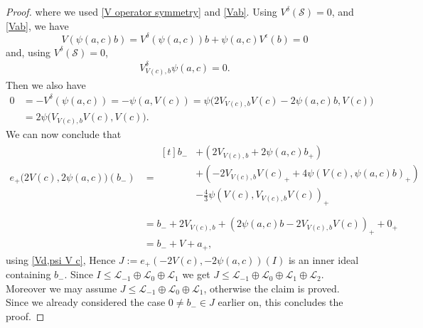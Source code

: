\documentclass[oneside,a4paper]{amsart} %
\theoremstyle{definition}
\renewcommand{\SS}{\mathcal{S}}
\newcommand{\LL}{\mathcal{L}}
\numberwithin{equation}{section}
\begin{document}
\begin{proof}
	  where we used \cref{V operator symmetry} and \cref{Vab}.
	  Using $V^\delta(\SS)=0$, \cite[(1.10)]{Allison1984} and \cref{Vab}, we have
	  \begin{equation}\label{V psi 0}
	  	V(\psi(a,c)b) = V^\delta(\psi(a,c))b+\psi(a,c)V^\epsilon(b)=0
	  \end{equation}  
	  and, using $V^\delta(\SS)=0$,
	  \begin{equation}\label{Vd}
	  \begin{aligned}
    	  V_{V(c),b}^\delta \psi(a,c) =0.
	  \end{aligned}
	  \end{equation}
	  Then we also have 
	  \begin{equation}
	  \label{psi V c}
	  \begin{aligned}
	  	0 &= -V^\delta(\psi(a,c)) = -\psi(a,V(c)) = \psi\bigl( 2V_{V(c),b}V(c)-2\psi(a,c)b,V(c) \bigr) \\
	  	&= 2\psi \bigl( V_{V(c),b}V(c),V(c) \bigr). 
	  \end{aligned}
	  \end{equation} 
	  We can now conclude that
     \begin{align*}
	  e_+ \bigl( 2V(c),2\psi(a,c) \bigr)(b_-) &=
	  \begin{aligned}[t]
	   b_- &+ (2V_{V(c),b} + 2\psi(a,c)b_+) \\
	       &+ (- 2V_{V(c),b}V(c)_+ + 4\psi(V(c),\psi(a,c)b)_+) \\
	       &- \tfrac{4}{3} \psi(V(c),V_{V(c),b}V(c))_+ \\
	  \end{aligned} \\
	  	&=b_-+2V_{V(c),b}+(2\psi (a,c)b-2V_{V(c),b}V(c))_++0_+ \\
        &= b_- + V + a_+,
	 \end{align*}
	 using \cref{Vd,psi V c}, 
	 Hence $J:=e_+(-2V(c),-2\psi (a,c))(I)$ is an inner ideal containing $b_-$. Since $I\leq \LL_{-1}\oplus \LL_0\oplus \LL_1$ we get $J\leq \LL_{-1}\oplus \LL_0\oplus \LL_1\oplus \LL_2$. Moreover we may assume $J\leq \LL_{-1}\oplus \LL_0\oplus \LL_1$, otherwise the claim is proved. Since we already considered the case $0\neq b_-\in J$ earlier on, this concludes the proof.
	 \fi
\end{proof}
\end{document}

